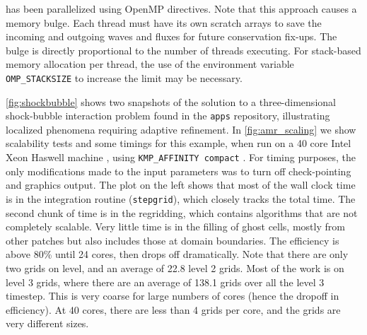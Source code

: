 \amrclaw has been parallelized using OpenMP directives.   Note that this approach causes a memory bulge. Each
thread must have its own scratch arrays to save the incoming and outgoing waves
and fluxes for future conservation fix-ups. The bulge is directly proportional
to the number of threads executing. For stack-based memory allocation per
thread, the use of the environment variable {\tt OMP\_STACKSIZE} to increase the
limit may be necessary.

\cref{fig:shockbubble} shows two snapshots of the solution to a
three-dimensional shock-bubble interaction problem found in the \clawpack
\texttt{apps} repository, illustrating localized phenomena requiring adaptive
refinement. In \cref{fig:amr_scaling} we show scalability tests and some timings
for this example, when run on a 40 core Intel Xeon Haswell machine 
, using
\texttt{KMP\_AFFINITY compact} .
For timing purposes, the only modifications made to the input parameters was to
turn off check-pointing and graphics output. The plot on the left shows that most
of the wall clock time is in the integration routine (\texttt{stepgrid}), which
closely tracks the total time. The second chunk of time is in the regridding,
which contains algorithms that are not completely scalable. Very little time is
in the filling of ghost cells, mostly from other patches but also includes those
at domain boundaries. The efficiency is above 80\% until 24 cores, then drops
off dramatically. Note that there are only two grids on level, and an average of
22.8 level 2 grids. Most of the work is on level 3 grids, where there are an
average of 138.1 grids over all the level 3 timestep.  This is very coarse for
large numbers of cores (hence the dropoff in efficiency). At 40 cores, there are
less than 4 grids per core, and the grids are very different sizes.

